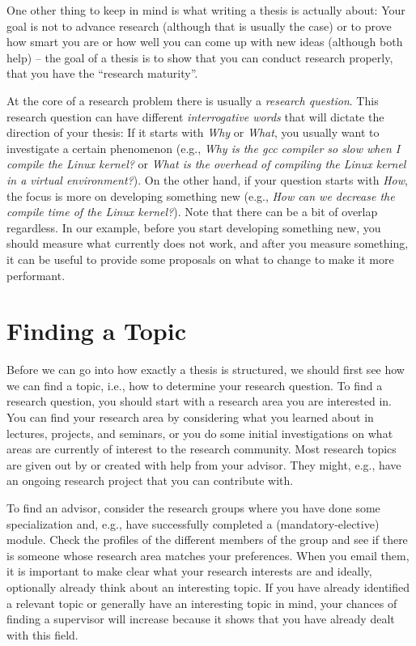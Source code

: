 \documentclass[a4paper]{article}
\begin{document}
One other thing to keep in mind is what writing a thesis is actually about:
Your goal is not to advance research (although that is usually the case) or to prove how smart you are or how well you can come up with new ideas (although both help) -- the goal of a thesis is to show that you can conduct research properly, that you have the ``research maturity''.

At the core of a research problem there is usually a \emph{research question}.
This research question can have different \emph{interrogative words} that will dictate the direction of your thesis:
If it starts with \emph{Why} or \emph{What}, you usually want to investigate a certain phenomenon (e.g., \emph{Why is the gcc compiler so slow when I compile the Linux kernel?} or \emph{What is the overhead of compiling the Linux kernel in a virtual environment?}).
On the other hand, if your question starts with \emph{How}, the focus is more on developing something new (e.g., \emph{How can we decrease the compile time of the Linux kernel?}).
Note that there can be a bit of overlap regardless.
In our example, before you start developing something new, you should measure what currently does not work, and after you measure something, it can be useful to provide some proposals on what to change to make it more performant.

\section{Finding a Topic}
\label{sec:topic}

Before we can go into how exactly a thesis is structured, we should first see how we can find a topic, i.e., how to determine your research question.
To find a research question, you should start with a research area you are interested in.
You can find your research area by considering what you learned about in lectures, projects, and seminars, or you do some initial investigations on what areas are currently of interest to the research community.
Most research topics are given out by or created with help from your advisor.
They might, e.g., have an ongoing research project that you can contribute with.

To find an advisor, consider the research groups where you have done some specialization and, e.g., have successfully completed a (mandatory-elective) module.
Check the profiles of the different members of the group and see if there is someone whose research area matches your preferences.
When you email them, it is important to make clear what your research interests are and ideally, optionally already think about an interesting topic.
If you have already identified a relevant topic or generally have an interesting topic in mind, your chances of finding a supervisor will increase because it shows that you have already dealt with this field.
\end{document}
